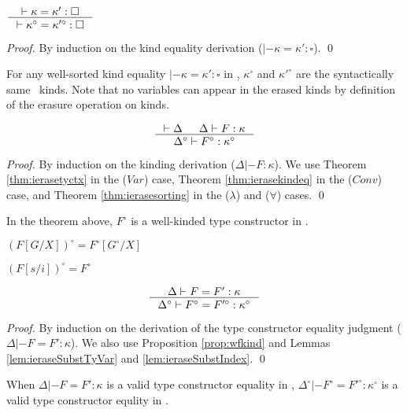 \begin{theorem}\label{thm:ierasekindeq}
$ \inference{|- \kappa=\kappa':\square}
        {|- \kappa^\circ=\kappa'^\circ:\square}
$
\end{theorem}
\begin{proof}
	By induction on the kind equality derivation
	($|- \kappa=\kappa':\square$).
	\qed
\end{proof}
\begin{remark}
For any well-sorted kind equality $|- \kappa=\kappa':\square$ in \Fi,
$\kappa^\circ$ and $\kappa'^\circ$ are the syntactically same \Fw\ kinds.
Note that no variables can appear in the erased kinds by definition of
the erasure operation on kinds.
\end{remark}

\begin{theorem}
\label{thm:ierasekinding}
\[ \inference{|- \Delta & \Delta |- F : \kappa}
                {\Delta^\circ |- F^\circ : \kappa^\circ}
\]
\end{theorem}
\begin{proof}
	By induction on the kinding derivation ($\Delta |- F : \kappa$).
	We use Theorem \ref{thm:ierasetyctx} in the ($Var$) case,
	Theorem \ref{thm:ierasekindeq} in the ($Conv$) case, and
	Theorem \ref{thm:ierasesorting} in the ($\lambda$) and ($\forall$) cases.
	\qed
\end{proof}
\begin{remark} In the theorem above, $F^\circ$ is a well-kinded type constructor in \Fw.
\end{remark}

\noindent
\begin{minipage}{.55\linewidth}
\begin{lemma}\label{lem:ieraseSubstTyVar}
$(F[G/X])^\circ = F^\circ[G^\circ/X]$
\end{lemma}
\end{minipage}
\begin{minipage}{.4\linewidth}
\begin{lemma}\label{lem:ieraseSubstIndex}
$(F[s/i])^\circ = F^\circ$
\end{lemma}
\end{minipage}
\begin{theorem}
\label{thm:ierasetyconeq}
\[ \inference{\Delta |- F=F':\kappa}
                {\Delta^\circ |- F^\circ=F'^\circ:\kappa^\circ}
\]
\end{theorem}
\begin{proof}
	By induction on the derivation of the type constructor equality judgment
	($\Delta |- F=F':\kappa$). We also use Proposition \ref{prop:wfkind}
	and Lemmas \ref{lem:ieraseSubstTyVar} and \ref{lem:ieraseSubstIndex}.
	\qed
\end{proof}
\begin{remark}
When $\Delta |- F=F':\kappa$ is a valid type constructor equality in \Fi,
$\Delta^\circ |- F^\circ=F'^\circ:\kappa^\circ$
is a valid type constructor equlity in \Fw.
\end{remark}

